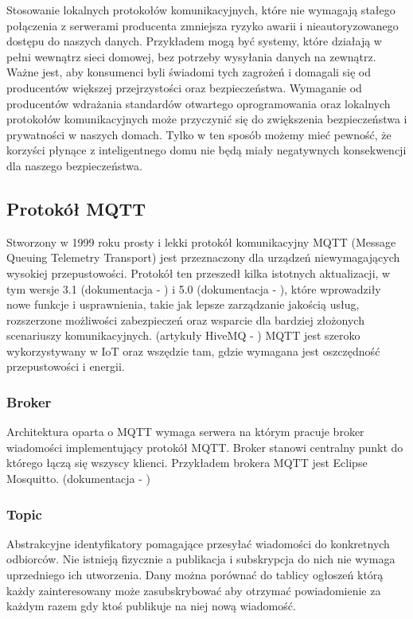 Stosowanie lokalnych protokołów komunikacyjnych, które nie wymagają stałego połączenia z serwerami producenta zmniejsza ryzyko awarii i nieautoryzowanego dostępu do naszych danych. Przykładem mogą być systemy, które działają w pełni wewnątrz sieci domowej, bez potrzeby wysyłania danych na zewnątrz.\\

Ważne jest, aby konsumenci byli świadomi tych zagrożeń i domagali się od producentów większej przejrzystości oraz bezpieczeństwa. Wymaganie od producentów wdrażania standardów otwartego oprogramowania oraz lokalnych protokołów komunikacyjnych może przyczynić się do zwiększenia bezpieczeństwa i prywatności w naszych domach. Tylko w ten sposób możemy mieć pewność, że korzyści płynące z inteligentnego domu nie będą miały negatywnych konsekwencji dla naszego bezpieczeństwa.

\newpage

\subsection{Protokół MQTT}
Stworzony w 1999 roku prosty i lekki protokół komunikacyjny MQTT (Message Queuing Telemetry Transport) jest przeznaczony dla urządzeń niewymagających wysokiej przepustowości. Protokół ten przeszedł kilka istotnych aktualizacji, w tym wersje 3.1 (dokumentacja - \cite{mqtt3spec}) i 5.0 (dokumentacja - \cite{mqtt5spec}), które wprowadziły nowe funkcje i usprawnienia, takie jak lepsze zarządzanie jakością usług, rozszerzone możliwości zabezpieczeń oraz wsparcie dla bardziej złożonych scenariuszy komunikacyjnych. (artykuły HiveMQ - \cite{mqtt5part1}\cite{mqtt5part2}) MQTT jest szeroko wykorzystywany w IoT oraz wszędzie tam, gdzie wymagana jest oszczędność przepustowości i energii.

\subsubsection{Broker}
Architektura oparta o MQTT wymaga serwera na którym pracuje broker wiadomości implementujący protokół MQTT. Broker stanowi centralny punkt do którego łączą się wszyscy klienci. Przykładem brokera MQTT jest Eclipse Mosquitto. (dokumentacja - \cite{mosquittodocs})

\hypertarget{03.3.2}{}
\subsubsection{Topic}
Abstrakcyjne identyfikatory pomagające przesyłać wiadomości do konkretnych odbiorców. Nie istnieją fizycznie a publikacja i subskrypcja do nich nie wymaga uprzedniego ich utworzenia. Dany  można porównać do tablicy ogłoszeń którą każdy zainteresowany może zasubskrybować aby otrzymać powiadomienie za każdym razem gdy ktoś publikuje na niej nową wiadomość.\\

